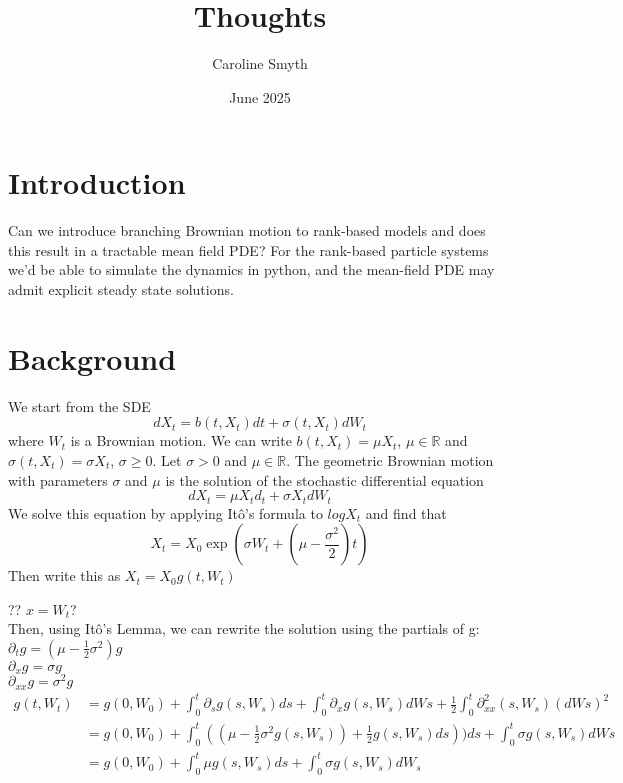 \documentclass{article}
\title{Thoughts}
\author{Caroline Smyth}
\date{June 2025}
\begin{document}
\maketitle

\section{Introduction} Can we introduce branching Brownian motion to rank-based models and does this result in a tractable mean field PDE?
For the rank-based particle systems we'd be able to simulate the dynamics in python, and the mean-field PDE may admit explicit steady state solutions. 
\section{Background}
We start from the SDE 
\begin{equation}
    dX_t = b(t, X_t)dt + \sigma(t, X_t)dW_t
\end{equation}
where $W_t$ is a Brownian motion. We can write $b(t, X_t) = \mu X_t$, $\mu \in \mathbb{R}$ and $\sigma(t, X_t) = \sigma X_t$, $\sigma \geq 0$.
Let $\sigma > 0$ and $\mu \in \mathbb{R}$. The geometric Brownian motion with parameters $\sigma$ and $\mu$ is the solution of the stochastic differential equation 
\begin{equation}
    dX_t = \mu X_t d_t +  \sigma X_t dW_t
\end{equation}
We solve this equation by applying It\^{o}'s formula to $log X_t$ and find that
\begin{equation}
    X_t = X_0 \exp (\sigma W_t + (\mu - \frac{\sigma^2}{2})t)
\end{equation}
Then write this as $X_t = X_0 g(t, W_t)$ 

?? $x = W_t$?\\
Then, using It\^{o}'s Lemma, we can rewrite the solution using the partials of g:
\\ $\partial_t g= (\mu - \frac{1}{2}\sigma^2)g$\\
$\partial_x g = \sigma g$\\
$\partial_{xx}g = \sigma^2 g$\\
\begin{align*}{}
    g(t, W_t) &= g(0, W_0)+ \int_0^t \partial_s g(s, W_s)ds + \int_0^t \partial _x g(s, W_s)d Ws + \frac{1}{2} \int_0^t \partial_{xx}^2 (s,W_s) (dWs)^2\\
    &= g(0, W_0) + \int_0^t((\mu - \frac{1}{2}\sigma^2 g(s, W_s)) + \frac{1}{2}g(s, W_s)ds))ds + \int_0^t\sigma g(s, W_s)dWs\\
     &= g(0, W_0) + \int_0^t\mu g(s, W_s) ds + \int_0^t \sigma g(s, W_s) dW_s 
\end{align*}
\end{document}
